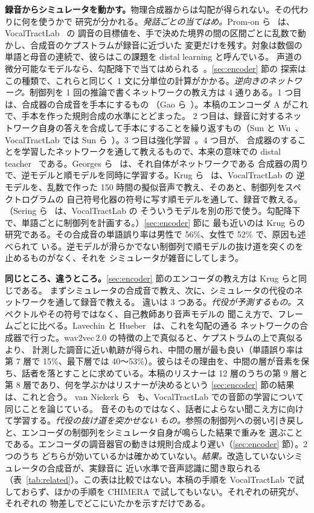 \documentclass[10pt,a4paper,twocolumn]{article}
\begin{document}
\textbf{録音からシミュレータを動かす。}物理合成器からは勾配が得られない。その代わりに何を使うかで
研究が分かれる。\emph{発話ごとの当てはめ。}Prom-on ら~\cite{promon} は、VocalTractLab~\cite{vtl} の
調音の目標値を、手で決めた境界の間の区間ごとに乱数で動かし、合成音のケプストラムが録音に近づいた
変更だけを残す。対象は数個の単語と母音の連続で、彼らはこの課題を distal learning と呼んでいる。
声道の微分可能なモデルなら、勾配降下で当てはめられる~\cite{sudholt,difftlm}。\ref{sec:encoder} 節の
探索はこの種類で、これらと同じく 1 文に分単位の計算がかかる。\emph{逆向きのネットワーク。}制御列を
1 回の推論で書くネットワークの教え方は 4 通りある。1 つ目は、合成器の合成音を手本にするもの
（Gao ら~\cite{gao}）。本稿のエンコーダ A がこれで、手本を作った規則合成の水準にとどまった。
2 つ目は、録音に対するネットワーク自身の答えを合成して手本にすることを繰り返すもの（Sun と
Wu~\cite{emjem}、VocalTractLab では Sun ら~\cite{sun}）。3 つ目は強化学習~\cite{shibata}。4 つ目が、
合成器のすることを学習したネットワークを通して教えるもので、本来の意味での distal
teacher~\cite{distal} である。Georges ら~\cite{georges,georges24} は、それ自体がネットワークである
合成器の周りで、逆モデルと順モデルを同時に学習する。Krug ら~\cite{krug} は、VocalTractLab の
逆モデルを、乱数で作った 150 時間の擬似音声で教え、そのあと、制御列をスペクトログラムの
自己符号化器の符号に写す順モデルを通して、録音で教える。（Sering ら~\cite{paule} は、VocalTractLab の
そういうモデルを別の形で使う。勾配降下で、単語ごとに制御列を計画する。）\ref{sec:encoder} 節に
最も近いのは Krug らの研究である。その合成音の単語誤り率は男性で 56\%、女性で 52\% で、原因も述べられて
いる。逆モデルが滑らかでない制御列で順モデルの抜け道を突くのを止めるものがなく、それを
シミュレータが雑音にしてしまう。

\textbf{同じところ、違うところ。}\ref{sec:encoder} 節のエンコーダの教え方は Krug らと同じである。
まずシミュレータの合成音で教え、次に、シミュレータの代役のネットワークを通して録音で教える。
違いは 3 つある。\emph{代役が予測するもの。}スペクトルやその符号ではなく、自己教師あり音声モデルの
聞こえ方で、フレームごとに比べる。Lavechin と Hueber~\cite{lavechin} は、これを勾配の通る
ネットワークの合成器で行った。wav2vec\,2.0 の特徴の上で真似ると、ケプストラムの上で真似るより、
計測した調音に近い軌跡が得られ、中間の層が最も良い（単語誤り率は第 7 層で 15\%、最下層では
40〜53\%）。彼らはその理由を、中間の層が音素を保ち、話者を落とすことに求めている。本稿のリスナーは
12 層のうちの第 9 層と第 8 層であり、何を学ぶかはリスナーが決めるという \ref{sec:encoder} 節の結果は、これと合う。
van Niekerk ら~\cite{beyond} も、VocalTractLab での音節の学習について同じことを論じている。
音そのものではなく、話者によらない聞こえ方に向けて学習する。\emph{代役の抜け道を突かせない
もの。}参照の制御列への弱い引き戻しと、エンコーダの制御列をシミュレータ自身が鳴らした結果で重みを
選ぶことである。エンコーダの調音器官の動きは規則合成より遅い（\ref{sec:encoder} 節）。2 つのうち
どちらが効いているかは確かめていない。\emph{結果。}改造していないシミュレータの合成音が、実録音に
近い水準で音声認識に聞き取られる（表~\ref{tab:related}）。この表は比較ではない。本稿の手順を
VocalTractLab で試しておらず、ほかの手順を CHIMERA で試してもいない。それぞれの研究が、それぞれの
物差しでどこにいたかを示すだけである。
\end{document}
